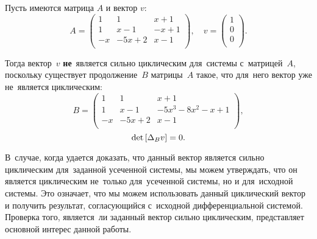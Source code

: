 \begin{example}
    Пусть имеются матрица $A$ и вектор $v$:
	\begin{equation*}
		A = 
		\begin{pmatrix}
			1 & 1 & x + 1 \\
			1 & x - 1 & -x + 1 \\
			-x & -5x + 2 & x - 1 \\
		\end{pmatrix},\quad
		v =
		\begin{pmatrix}
			1 \\
			0 \\
			0 \\
		\end{pmatrix}.
	\end{equation*}
    
	Тогда вектор~$v$ \textbf{не}~является сильно циклическим для~системы с~матрицей~$A$,
    поскольку существует продолжение~$B$ матрицы~$A$ такое,
    что для~него вектор уже не~является циклическим:
	\begin{equation*}
		B = 
		\begin{pmatrix}
			1 & 1 & x + 1 \\
			1 & x - 1 & -5x^3 -8x^2 -x + 1 \\
			-x & -5x + 2 & x - 1 \\
		\end{pmatrix},
	\end{equation*}
    \begin{equation*}
		\mathop{\rm det}\text{$ [\Delta_B v] $} = 0.
	\end{equation*}
\end{example}

\newpage
В~случае, когда удается доказать, что данный вектор является сильно циклическим для~заданной усеченной системы,
мы можем утверждать, что он является циклическим не~только для~усеченной системы, но и для~исходной системы.
Это означает, что мы можем использовать данный циклический вектор и получить результат,
согласующийся с~исходной дифференциальной системой.
Проверка того, является~ли заданный вектор сильно циклическим, представляет основной интерес данной работы.